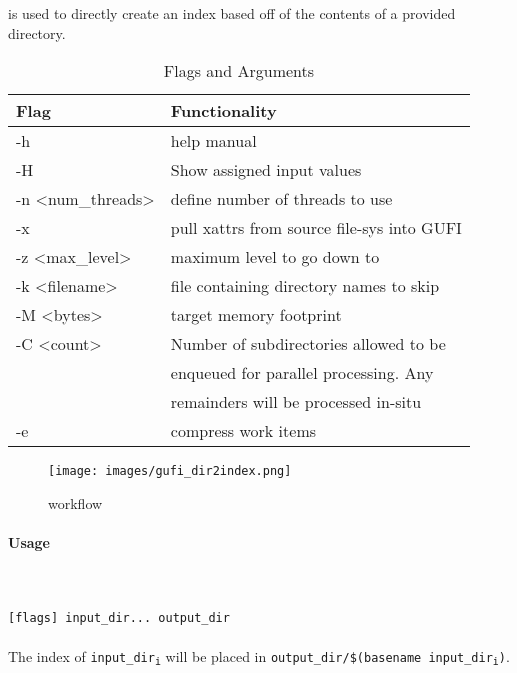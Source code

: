 \subsubsection{\gufidirindex}
\gufidirindex is used to directly create an index based off of the
contents of a provided directory.

\begin{table} [h]
  \centering
  \begin{tabular}{l|l}
    Flag & Functionality \\
    \hline
    -h & help manual \\
    \hline
    -H & Show assigned input values \\
    \hline
    -n \textless num\_threads\textgreater & define number of threads to use \\
    \hline
    -x & pull xattrs from source file-sys into GUFI \\
    \hline
    -z \textless max\_level\textgreater & maximum level to go down to \\
    \hline
    -k \textless filename\textgreater & file containing directory names to skip \\
    \hline
    -M \textless bytes\textgreater & target memory footprint \\
    \hline
    -C \textless count\textgreater & Number of subdirectories allowed to be \\
                                   & enqueued for parallel processing. Any \\
                                   & remainders will be processed in-situ \\
    \hline
    -e & compress work items \\
    \hline
  \end{tabular}
  \caption{\label{fig:Flags_for_dir2index} \gufidirindex Flags and Arguments}
\end{table}

\begin{figure} [h]
  \centering
  \texttt{[image: images/gufi\_dir2index.png]}
  \caption{\label{fig:gufi_dir2index} \gufidirindex workflow}
\end{figure}

\paragraph{Usage} ~\\\\
\gufidirindex \texttt{[flags] input\_dir... output\_dir} \\\\
The index of \texttt{input\_dir\textsubscript{i}} will be placed in \texttt{output\_dir/\$(basename input\_dir\textsubscript{i})}.
